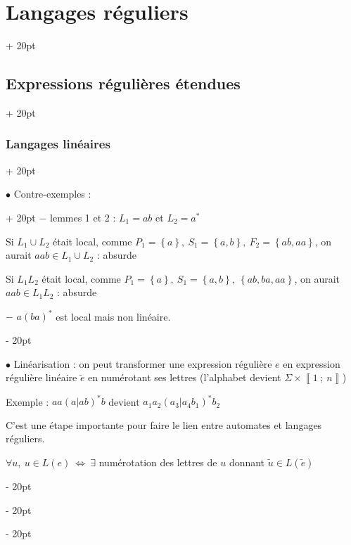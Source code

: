\documentclass[a4paper, 12pt, twoside]{article}
\newcommand{\nset}[2]{\left\llbracket #1\ ;\ #2 \right\rrbracket}
\newcommand{\set}[1]{\left\{ #1 \right\}}
\newcommand{\ssi}{\ \Leftrightarrow \ }
\newcommand{\ind}[1][20pt]{\advance\leftskip + #1}
\newcommand{\deind}[1][20pt]{\advance\leftskip - #1}
\newenvironment{indt}[2][20pt]{#2 \par \ind[#1]}{\par \deind} %
\begin{document}
\begin{indt}{\section{Langages réguliers}}
\begin{indt}{\subsection{Expressions régulières étendues}}
\begin{indt}{\subsubsection{Langages linéaires}}
                \vspace{12pt}
                
                \begin{indt}{$\bullet$ Contre-exemples :}
                    $-$ lemmes 1 et 2 : $L_1 = ab$ et $L_2 = a^*$

                    Si $L_1 \cup L_2$ était local, comme $P_1 = \set a,\ S_1 = \set{a, b},\ F_2 = \set{ab, aa}$, on aurait $aab \in L_1 \cup L_2$ : absurde

                    Si $L_1 L_2$ était local, comme $P_1 = \set a,\ S_1 = \set{a, b},\ \set{ab, ba, aa}$, on aurait $aab \in L_1 L_2$ : absurde

                    \vspace{6pt}
                    
                    $-$ $a(ba)^*$ est local mais non linéaire.
                \end{indt}

                \vspace{12pt}
                
                $\bullet$ Linéarisation : on peut transformer une expression régulière $e$ en expression régulière linéaire $\tilde e$ en numérotant ses lettres (l'alphabet devient $\Sigma \times \nset 1 n$)

                \vspace{12pt}
                
                Exemple : $aa(a | ab)^*b$ devient $a_1a_2(a_3 | a_4b_1)^*b_2$

                C'est une étape importante pour faire le lien entre automates et langages réguliers.

                 $\forall u,\ u \in L(e) \ssi \exists$ numérotation des lettres de $u$ donnant $\tilde u \in L(\tilde e)$
            \end{indt}
        \end{indt}
    \end{indt}
    
\end{document}
